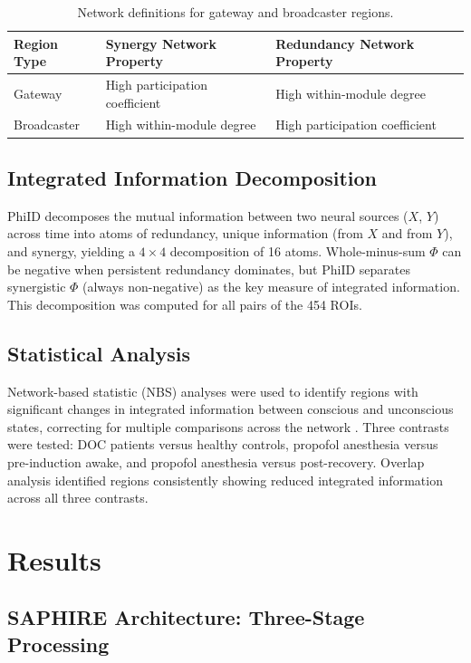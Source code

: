 \documentclass[11pt]{article}
\begin{document}
\begin{table}[htbp]
\centering
\caption{Network definitions for gateway and broadcaster regions.}
\label{tab:definitions}
\begin{tabular}{lll}
\toprule
Region Type & Synergy Network Property & Redundancy Network Property \\
\midrule
Gateway & High participation coefficient & High within-module degree \\
Broadcaster & High within-module degree & High participation coefficient \\
\bottomrule
\end{tabular}
\end{table}

\subsection{Integrated Information Decomposition}

PhiID decomposes the mutual information between two neural sources ($X$, $Y$) across time into atoms of redundancy, unique information (from $X$ and from $Y$), and synergy, yielding a $4 \times 4$ decomposition of 16 atoms. Whole-minus-sum $\Phi$ can be negative when persistent redundancy dominates, but PhiID separates synergistic $\Phi$ (always non-negative) as the key measure of integrated information. This decomposition was computed for all pairs of the 454 ROIs.

\subsection{Statistical Analysis}

Network-based statistic (NBS) analyses were used to identify regions with significant changes in integrated information between conscious and unconscious states, correcting for multiple comparisons across the network \citep{zalesky2010network}. Three contrasts were tested: DOC patients versus healthy controls, propofol anesthesia versus pre-induction awake, and propofol anesthesia versus post-recovery. Overlap analysis identified regions consistently showing reduced integrated information across all three contrasts.

\section{Results}

\subsection{SAPHIRE Architecture: Three-Stage Processing}
\end{document}
